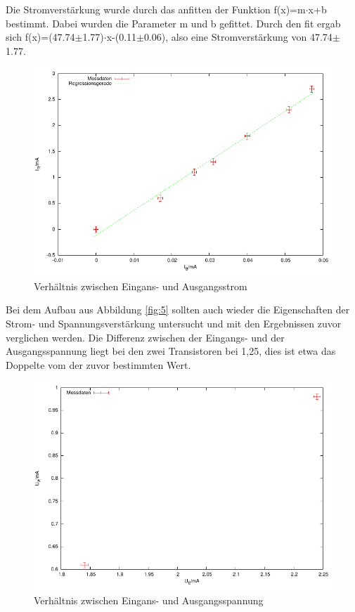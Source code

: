 \documentclass[12pt,a4paper]{article}
\begin{document}
Die Stromverstärkung wurde durch das anfitten der Funktion f(x)=m$\cdot$x+b bestimmt. Dabei wurden die Parameter m und b gefittet. Durch den fit ergab sich f(x)=(47.74$\pm$1.77)$\cdot$x-(0.11$\pm$0.06), also eine Stromverstärkung von 47.74$\pm$1.77.

\begin{figure}[H] 
  \centering
    \includegraphics[scale = 0.7]{a_3_i.pdf}
  	\caption[Verhältnis zwischen Eingans- und Ausgangsstrom]{Verhältnis zwischen Eingans- und Ausgangsstrom}
  \label{fig:a_3_i}
\end{figure}


Bei dem Aufbau aus Abbildung \ref{fig:5} sollten auch wieder die Eigenschaften der Strom- und Spannungsverstärkung untersucht und mit den Ergebnissen zuvor verglichen werden. Die Differenz zwischen der Eingangs- und der Ausgangsspannung liegt bei den zwei Transistoren bei 1,25, dies ist etwa das Doppelte vom der zuvor bestimmten Wert.



\begin{figure}[H] 
  \centering
    \includegraphics[scale = 0.7]{a_3b_u.pdf}
  	\caption[Verhältnis zwischen Eingans- und Ausgangsspannung]{Verhältnis zwischen Eingans- und Ausgangsspannung}
  \label{fig:a_3b_u}
\end{figure}
\end{document}
